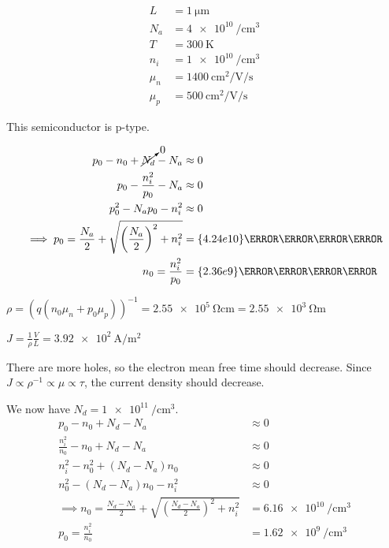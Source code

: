 \documentclass{article}
\begin{document}
\maketitle

\question{}

\begin{align}
  L &= \qty{1}{\micro\meter} \\
  N_{a} &= \qty{4e10}{\per\centi\meter\cubed} \\
  T &= \qty{300}{\kelvin} \\
  n_{i} &= \qty{1e10}{\per\centi\meter\cubed} \\
  \mu_{n} &= \qty{1400}{\centi\meter\squared\per\volt\per\second} \\
  \mu_{p} &= \qty{500}{\centi\meter\squared\per\volt\per\second}
\end{align}

\begin{subparts}
  \item This semiconductor is p-type.
  \item %
  \begin{align}
    p_{0} - n_{0} + \cancelto{0}{N_{d}} - N_{a} &\approx 0 \\
    p_{0} - \frac{n_{i}^{2}}{p_{0}} - N_{a} &\approx 0 \\
    p_{0}^{2} - N_{a} p_{0} - n_{i}^{2} &\approx 0 \\
    \implies p_{0} = \frac{N_{a}}{2} + \sqrt{\left(\frac{N_{a}}{2}\right)^{2} + n_{i}^{2}} &= \qty{4.24e10}{\per\centi\meter\cubed} \\
    n_{0} = \frac{n_{i}^{2}}{p_{0}} &= \qty{2.36e9}{\per\centi\meter\cubed}
  \end{align}
  \item \(\rho = (q (n_{0} \mu_{n} + p_{0} \mu_{p}))^{-1} = \qty{2.55e5}{\ohm\centi\meter} = \qty{2.55e3}{\ohm\meter}\)
  \item \(J = \frac{1}{\rho} \frac{V}{L} = \qty{3.92e2}{\ampere\per\meter\squared}\)
  \item There are more holes, so the electron mean free time should decrease.
  Since \(J \propto \rho^{-1} \propto \mu \propto \tau\), the current density should decrease.
  \item We now have \(N_{d} = \qty{1e11}{\per\centi\meter\cubed}\).
  \begin{align}
    p_{0} - n_{0} + N_{d} - N_{a} &\approx 0 \\
    \frac{n_{i}^{2}}{n_{0}} - n_{0} + N_{d} - N_{a} &\approx 0 \\
    n_{i}^{2} - n_{0}^{2} + (N_{d} - N_{a}) n_{0} &\approx 0 \\
    n_{0}^{2} - (N_{d} - N_{a}) n_{0} - n_{i}^{2} &\approx 0 \\
    \implies n_{0} = \frac{N_{d} - N_{a}}{2} + \sqrt{\left(\frac{N_{d} - N_{a}}{2}\right)^{2} + n_{i}^{2}} &= \qty{6.16e10}{\per\centi\meter\cubed} \\
    p_{0} = \frac{n_{i}^{2}}{n_{0}} &= \qty{1.62e9}{\per\centi\meter\cubed}
  \end{align}
\end{subparts}
\end{document}
